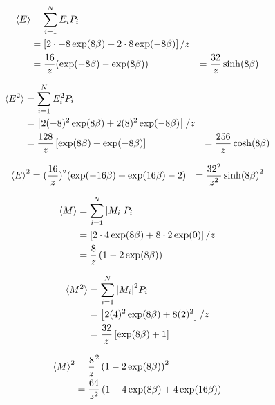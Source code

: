 \begin{align}
  \braket{E} &= \sum_{i=1}^{N} E_i P_i \\
             &= \left[2 \cdot -8 \exp(8\beta) + 2\cdot 8 \exp(-8\beta)\right] / z \\
             &= \frac{16}{z} ( \exp(-8\beta) - \exp(8\beta))
             &= \frac{32}{z} \sinh(8\beta)
\end{align}


\begin{align}
  \braket{E^2} &= \sum_{i=1}^{N} E_i^2 P_i \\
                &= \left[ 2 (-8)^2\exp(8\beta) + 2 (8)^2\exp(-8\beta) \right] /z \\
                &= \frac{128}{z}\left[ \exp(8 \beta) + \exp(-8\beta)\right]
                &= \frac{256}{z} \cosh(8\beta)
\end{align}

\begin{align}
  \braket{E}^2 &= (\frac{16}{z})^2 ( \exp(-16\beta) + \exp(16\beta) - 2)
               &= \frac{32^2}{z^2} \sinh(8\beta)^2
\end{align}

\begin{align}
  \braket{M} &= \sum_{i=1}^{N} \abs{M_i} P_i \\
             &= \left[2\cdot 4 \exp(8\beta ) + 8 \cdot 2 \exp(0)\right] / z \\
             &= \frac{8}{z} \left( 1 - 2\exp(8\beta) \right)
\end{align}


\begin{align}
  \braket{M^2} &= \sum_{i=1}^{N} \abs{M_i}^2 P_i \\
               &= \left[2 (4)^2 \exp(8\beta) + 8 (2)^2\right] / z \\
               &= \frac{32}{z} \left[ \exp(8\beta) + 1 \right]
\end{align}

\begin{align}
  \braket{M}^2 &= \frac{8}{z}^2 \left( 1 - 2\exp(8\beta) \right)^2 \\
               &= \frac{64}{z^2} \left( 1 - 4\exp(8\beta) + 4\exp(16\beta) \right)
\end{align}


%
%
%
